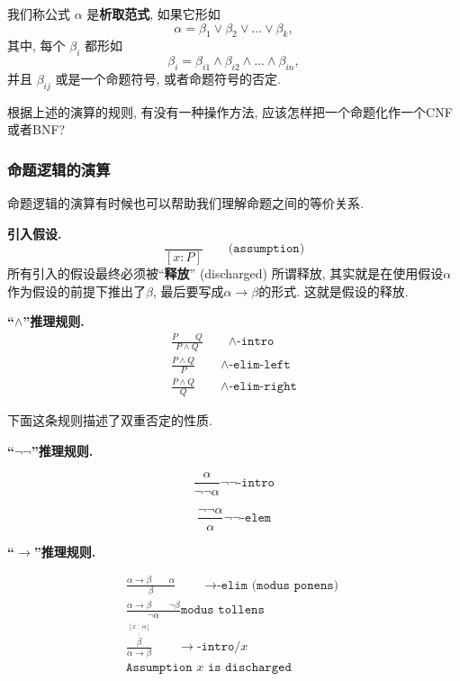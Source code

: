     \begin{definition}
            我们称公式 $\alpha$ 是{\bf 析取范式}, 如果它形如
            \[
              \alpha = \beta_{1} \lor \beta_{2} \lor \dots \lor \beta_{k},
            \]
            其中, 每个 $\beta_{i}$ 都形如
            \[
              \beta_{i} = \beta_{i1} \land \beta_{i2} \land \dots \land \beta_{in},
            \]
            并且 $\beta_{ij}$ 或是一个命题符号, 或者命题符号的否定. 
    \end{definition}

    \begin{bonus}
      根据上述的演算的规则, 有没有一种操作方法, 应该怎样把一个命题化作一个CNF或者BNF?
    \end{bonus}

    \subsubsection{命题逻辑的演算}

    命题逻辑的演算有时候也可以帮助我们理解命题之间的等价关系. 

    \textbf{引入假设.}
    \[
        \frac{~}{[x : P]} \qquad\texttt{(assumption)}
    \] 
    所有引入的假设最终必须被``{\bf 释放}'' (discharged)
    所谓释放, 其实就是在使用假设$\alpha$作为假设的前提下推出了$\beta$, 最后要写成$\alpha \rightarrow \beta$的形式. 这就是假设的释放. 

    \textbf{``$\land$''推理规则.}
    \begin{gather*}
        \frac{P \qquad Q}{P \land Q} \qquad{\land\texttt{-intro}}\\
        \frac{P \land Q}{P}\qquad{\land\texttt{-elim-left}}\\
        \frac{P \land Q}{Q}\qquad{\land\texttt{-elim-right}}
    \end{gather*}
    
    下面这条规则描述了双重否定的性质. 
    
    \textbf{``$\lnot\lnot$''推理规则.}

    \[
        \frac{\alpha}{\lnot \lnot \alpha}{\lnot\lnot\texttt{-intro}}
    \]

    \[
        \frac{\lnot \lnot \alpha}{\alpha}{\lnot\lnot\texttt{-elem}}
    \]
    
    \textbf{``$\to$''推理规则.}
    
    \begin{gather*}
        \frac{\alpha \to \beta \qquad \alpha}{\beta}\qquad {\to\texttt{-elim (modus ponens)}}
        \\
        \frac{\alpha \to \beta \qquad \lnot \beta}{\lnot \alpha}{\texttt{modus tollens}}
        \\
        \frac{\stackrel{[x \;:\; \alpha]}{\stackrel{\vdots}{\beta}}}{\alpha \to \beta}\qquad {\to\texttt{-intro}/x} \\
        \texttt{{Assumption $x$ is discharged}}
      \end{gather*}


